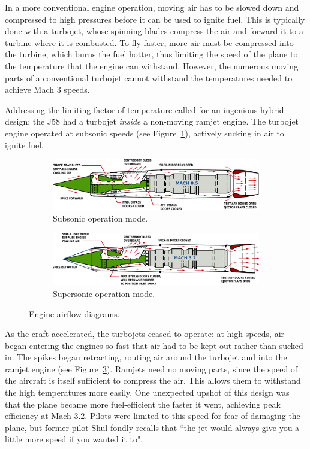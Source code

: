 \documentclass[12pt, draftclsnofoot, onecolumn]{IEEEtran}
\newcommand{\figref}[1]{Figure~\ref{fig:#1}}
\begin{document}
	In a more conventional engine operation, moving air has to be slowed down and compressed to high pressures before it can be used to ignite fuel. This is typically done with a turbojet, whose spinning blades compress the air and forward it to a turbine where it is combusted. To fly faster, more air must be compressed into the turbine, which burns the fuel hotter, thus limiting the speed of the plane to the temperature that the engine can withstand. However, the numerous moving parts of a conventional turbojet cannot withstand the temperatures needed to achieve Mach 3 speeds.
	
	 Addressing the limiting factor of temperature called for an ingenious hybrid design: the J58 had a turbojet \emph{inside} a non-moving ramjet engine. The turbojet engine operated at subsonic speeds (see \figref{subsonic}), actively sucking in air to ignite fuel.
	 
	\begin{figure}[h]
	\centering
		\begin{subfigure}{0.8\textwidth}
			\includegraphics[width=\textwidth]{mach05.pdf}
			\caption{Subsonic operation mode.}\label{fig:subsonic}
		\end{subfigure}
		\begin{subfigure}{0.8\textwidth}
			\includegraphics[width=\textwidth]{mach32.pdf}
			\caption{Supersonic operation mode.}\label{fig:supersonic}
		\end{subfigure}
		\caption{Engine airflow diagrams.}
	\end{figure}
	
	As the craft accelerated, the turbojets ceased to operate: at high speeds, air began entering the engines so fast that air had to be kept out rather than sucked in. The spikes began retracting, routing air around the turbojet and into the ramjet engine (see \figref{supersonic}). Ramjets need no moving parts, since the speed of the aircraft is itself sufficient to compress the air. This allows them to withstand the high temperatures more easily. One unexpected upshot of this design was that the plane became more fuel-efficient the faster it went, achieving peak efficiency at Mach 3.2. Pilots were limited to this speed for fear of damaging the plane, but former pilot Shul fondly recalls that ``the jet would always give you a little more speed if you wanted it to"\cite{sleddriver}.
	
\end{document}
